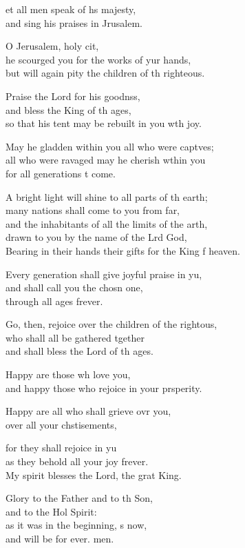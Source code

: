 \begin{psalmverse}
  \begin{patverse}
et all men speak of h\pointup{\i}s majesty,\Med\\
and sing his praises in Jrusalem.

O Jerusalem, holy cit,\Flex\\
he scourged you for the works of yur hands,\Med\\
but will again pity the children of th righteous.

Praise the Lord for his goodnss,\Flex\\
and bless the King of th ages,\Med\\
so that his tent may be rebuilt in you w\pointup{\i}th joy.

May he gladden within you all who were capt\pointup{\i}ves;\Flex\\
all who were ravaged may he cherish w\pointup{\i}thin you\Med\\
for all generations t come.

A bright light will shine to all parts of th earth;\Med\\
many nations shall come to you from far,\\
and the inhabitants of all the limits of the arth,\Flex\\
drawn to you by the name of the Lrd God,\Med\\
Bearing in their hands their gifts for the King f heaven.

Every generation shall give joyful praise in yu,\Flex\\
and shall call you the chosn one,\Med\\
through all ages frever.

Go, then, rejoice over the children of the rightous,\Flex\\
who shall all be gathered tgether\Med\\
and shall bless the Lord of th ages.

Happy are those wh love you,\Med\\
and happy those who rejoice in your prsperity.

Happy are all who shall grieve ovr you,\Med\\
over all your chstisements,

for they shall rejoice in yu\Flex\\
as they behold all your joy frever.\Med\\
My spirit blesses the Lord, the grat King.

Glory to the Father and to th Son,\Med\\
and to the Hol Spirit:\\
as it was in the beginning, \pointup{\i}s now,\Med\\
and will be for ever. men.

  \end{patverse}
\end{psalmverse}
